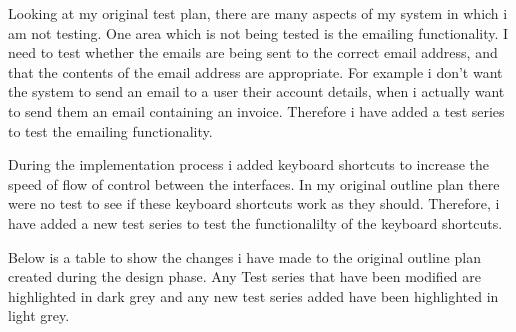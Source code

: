 \begin{landscape}
 Looking at my original test plan, there are many aspects of my system in which i am not testing. One area which is not being tested is the emailing functionality. I need to test whether the emails are being sent to the correct email address, and that the contents of the email address are appropriate. For example i don't want the system to send an email to a user their account details, when i actually want to send them an email containing an invoice. Therefore i have added a test series to test the emailing functionality. \par

During the implementation process i added keyboard shortcuts to increase the speed of flow of control between the interfaces. In my original outline plan there were no test to see if these keyboard shortcuts work as they should. Therefore, i have added a new test series to test the functionalilty of the keyboard shortcuts. \par

Below is a table to show the changes i have made to the original outline plan created during the design phase. Any Test series that have been modified are highlighted in dark grey  and any new test series added have been highlighted in light grey.

\begin{center}
    \begin{tabular}{|p{2cm}|p{5cm}|p{5cm}|p{4cm}|}
        \hline
	

\end{tabular}
\end{center}
\end{landscape}

